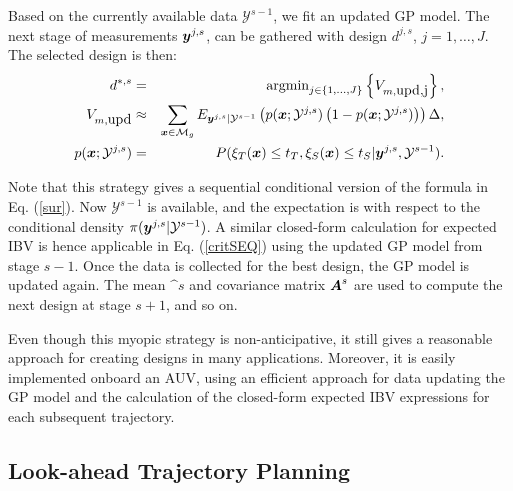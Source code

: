 \documentclass[aoas]{imsart}
\begin{document}
Based on the currently available data $\mathcal{Y}^{s-1}$, we
fit an updated GP model.  The next stage of measurements
${\boldsymbol y}^{j,s}$, can be gathered with design $d^{j,s}$, $j=1,\ldots,J$. The
selected design is then:
\begin{eqnarray}\label{critSEQ}
    d^{*,s} &=& \mbox{argmin}_{j \in \{1,\ldots,J\}} \left\{ V_{m,\mbox{upd,j}} \right\},  \\
V_{m,\mbox{upd}} & \approx & \sum_{\bx \in \mathcal{M}_g} E_{\by^{j,s}|\mathcal{Y}^{s-1}} \left( p(\bx;\mathcal{Y}^{j,s})\left( 1-p(\bx;\mathcal{Y}^{j,s})\right) \right) \Delta, \nonumber \\
    p(\bx;\mathcal{Y}^{j,s}) &=& P(\xi_T(\bx) \leq t_T, \xi_S(\bx) \leq t_S |\by^{j,s},\mathcal{Y}^{s-1}). \nonumber
\end{eqnarray}

Note that this strategy gives a sequential conditional version of the
formula in Eq. (\ref{sur}). Now $\mathcal{Y}^{s-1}$ is available, and
the expectation is with respect to the conditional density
$\pi({\boldsymbol y}^{j,s}|\mathcal{Y}^{s-1})$. A similar closed-form calculation
for expected IBV is hence applicable in Eq. (\ref{critSEQ}) using the
updated GP model from stage $s-1$. Once the data is collected for the
best design, the GP model is updated again. The mean $\bm^{s}$ and
covariance matrix ${\boldsymbol A}^{s}$ are used to compute the next design at
stage $s+1$, and so on.

Even though this myopic strategy is non-anticipative, it still gives a
reasonable approach for creating designs in many
applications. Moreover, it is easily implemented onboard an AUV,
using an efficient approach for data updating the GP model and the
calculation of the closed-form expected IBV expressions for each
subsequent trajectory.


\subsection{Look-ahead Trajectory Planning}
\label{sec:LA}
\end{document}
